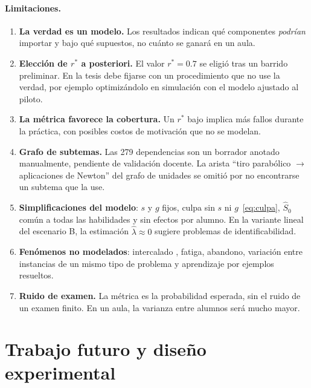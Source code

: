 \documentclass[11pt]{article}
\theoremstyle{definition}
\theoremstyle{remark}
\newcommand{\Sh}{\hat S}
\newcommand{\rstar}{r^{\ast}}
\begin{document}
\paragraph{Limitaciones.}
\begin{enumerate}
\item \textbf{La verdad es un modelo.} Los resultados indican qué componentes \emph{podrían} importar y bajo qué supuestos, no cuánto se ganará en un aula.
\item \textbf{Elección de $\rstar$ a posteriori.} El valor $\rstar=0.7$ se eligió tras un barrido preliminar. En la tesis debe fijarse con un procedimiento que no use la verdad, por ejemplo optimizándolo en simulación con el modelo ajustado al piloto.
\item \textbf{La métrica favorece la cobertura.} Un $\rstar$ bajo implica más fallos durante la práctica, con posibles costos de motivación que no se modelan.
\item \textbf{Grafo de subtemas.} Las 279 dependencias son un borrador anotado manualmente, pendiente de validación docente. La arista ``tiro parabólico $\to$ aplicaciones de Newton'' del grafo de unidades se omitió por no encontrarse un subtema que la use.
\item \textbf{Simplificaciones del modelo}: $s$ y $g$ fijos, culpa sin $s$ ni $g$~\eqref{eq:culpa}, $\Sh_0$ común a todas las habilidades y sin efectos por alumno. En la variante lineal del escenario B, la estimación $\hat\lambda\approx0$ sugiere problemas de identificabilidad.
\item \textbf{Fenómenos no modelados}: intercalado \citep{rohrer2015}, fatiga, abandono, variación entre instancias de un mismo tipo de problema y aprendizaje por ejemplos resueltos.
\item \textbf{Ruido de examen.} La métrica es la probabilidad esperada, sin el ruido de un examen finito. En un aula, la varianza entre alumnos será mucho mayor.
\end{enumerate}

\section{Trabajo futuro y diseño experimental}
\label{sec:futuro}
\end{document}
